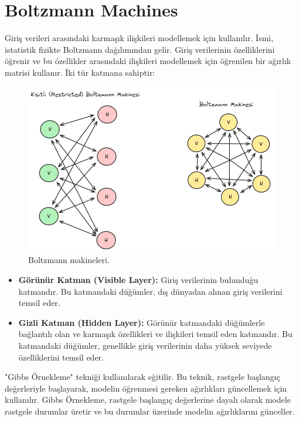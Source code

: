 \section{Boltzmann Machines}
Giriş verileri arasındaki karmaşık ilişkileri modellemek için kullanılır. İsmi, istatistik fizikte Boltzmann dağılımından gelir. Giriş verilerinin özelliklerini öğrenir ve bu özellikler arasındaki ilişkileri modellemek için öğrenilen bir ağırlık matrisi kullanır. İki tür katmana sahiptir:

\begin{figure}[h]
    \centering
    \includegraphics[width=1\textwidth]{images/boltzmann_machines.png}
    \caption{Boltzmann makineleri.}
    \label{fig:enter-label}
\end{figure}

\begin{itemize}
    \item \textbf{Görünür Katman (Visible Layer):} Giriş verilerinin bulunduğu katmandır. Bu katmandaki düğümler, dış dünyadan alınan giriş verilerini temsil eder.
    \item \textbf{Gizli Katman (Hidden Layer):} Görünür katmandaki düğümlerle bağlantılı olan ve karmaşık özellikleri ve ilişkileri temsil eden katmandır. Bu katmandaki düğümler, genellikle giriş verilerinin daha yüksek seviyede özelliklerini temsil eder.
\end{itemize}

"Gibbs Örnekleme" tekniği kullanılarak eğitilir. Bu teknik, rastgele başlangıç değerleriyle başlayarak, modelin öğrenmesi gereken ağırlıkları güncellemek için kullanılır. Gibbs Örnekleme, rastgele başlangıç değerlerine dayalı olarak modele rastgele durumlar üretir ve bu durumlar üzerinde modelin ağırlıklarını günceller.

